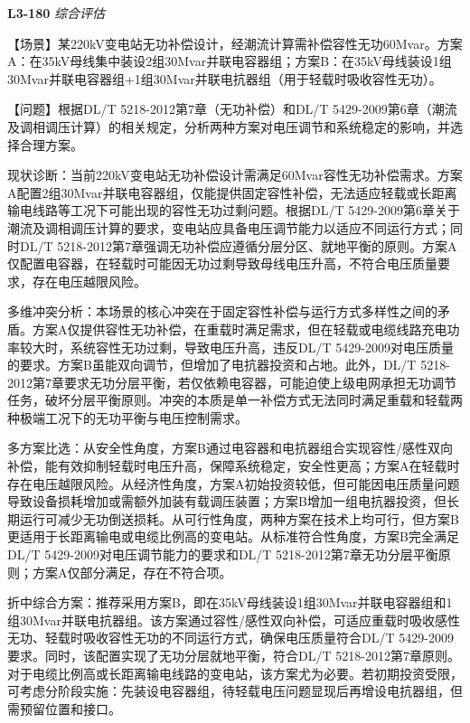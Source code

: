 \documentclass[12pt,a4paper]{ctexart}
\begin{document}
\noindent\textbf{L3-180} \hfill \textit{综合评估}
\begin{description}[leftmargin=1.5em,style=nextline,font=\normalfont]
  \item[Q:] 【场景】某220kV变电站无功补偿设计，经潮流计算需补偿容性无功60Mvar。方案A：在35kV母线集中装设2组30Mvar并联电容器组；方案B：在35kV母线装设1组30Mvar并联电容器组+1组30Mvar并联电抗器组（用于轻载时吸收容性无功）。

【问题】根据DL/T 5218-2012第7章（无功补偿）和DL/T 5429-2009第6章（潮流及调相调压计算）的相关规定，分析两种方案对电压调节和系统稳定的影响，并选择合理方案。
  \item[A:] 现状诊断：当前220kV变电站无功补偿设计需满足60Mvar容性无功补偿需求。方案A配置2组30Mvar并联电容器组，仅能提供固定容性补偿，无法适应轻载或长距离输电线路等工况下可能出现的容性无功过剩问题。根据DL/T 5429-2009第6章关于潮流及调相调压计算的要求，变电站应具备电压调节能力以适应不同运行方式；同时DL/T 5218-2012第7章强调无功补偿应遵循分层分区、就地平衡的原则。方案A仅配置电容器，在轻载时可能因无功过剩导致母线电压升高，不符合电压质量要求，存在电压越限风险。

多维冲突分析：本场景的核心冲突在于固定容性补偿与运行方式多样性之间的矛盾。方案A仅提供容性无功补偿，在重载时满足需求，但在轻载或电缆线路充电功率较大时，系统容性无功过剩，导致电压升高，违反DL/T 5429-2009对电压质量的要求。方案B虽能双向调节，但增加了电抗器投资和占地。此外，DL/T 5218-2012第7章要求无功分层平衡，若仅依赖电容器，可能迫使上级电网承担无功调节任务，破坏分层平衡原则。冲突的本质是单一补偿方式无法同时满足重载和轻载两种极端工况下的无功平衡与电压控制需求。

多方案比选：从安全性角度，方案B通过电容器和电抗器组合实现容性/感性双向补偿，能有效抑制轻载时电压升高，保障系统稳定，安全性更高；方案A在轻载时存在电压越限风险。从经济性角度，方案A初始投资较低，但可能因电压质量问题导致设备损耗增加或需额外加装有载调压装置；方案B增加一组电抗器投资，但长期运行可减少无功倒送损耗。从可行性角度，两种方案在技术上均可行，但方案B更适用于长距离输电或电缆比例高的变电站。从标准符合性角度，方案B完全满足DL/T 5429-2009对电压调节能力的要求和DL/T 5218-2012第7章无功分层平衡原则；方案A仅部分满足，存在不符合项。

折中综合方案：推荐采用方案B，即在35kV母线装设1组30Mvar并联电容器组和1组30Mvar并联电抗器组。该方案通过容性/感性双向补偿，可适应重载时吸收感性无功、轻载时吸收容性无功的不同运行方式，确保电压质量符合DL/T 5429-2009要求。同时，该配置实现了无功分层就地平衡，符合DL/T 5218-2012第7章原则。对于电缆比例高或长距离输电线路的变电站，该方案尤为必要。若初期投资受限，可考虑分阶段实施：先装设电容器组，待轻载电压问题显现后再增设电抗器组，但需预留位置和接口。


\end{description}
\end{document}
